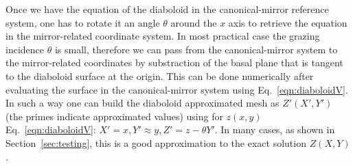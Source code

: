 \documentclass{iucr}              %
\newcommand{\inred}[1]{{\color{red}#1}}
\begin{document}







Once we have the equation of the diaboloid in the canonical-mirror reference system, one has to rotate it an angle $\theta$ around the $x$ axis to retrieve the equation in the mirror-related coordinate system. 
In most practical case the grazing incidence $\theta$ is small, therefore we can pass from the canonical-mirror system to the mirror-related coordinates by substraction of the basal plane that is tangent to the diaboloid surface at the origin. This can be done numerically after evaluating the surface in the canonical-mirror system using Eq.~\ref{eqn:diaboloidV}. \inred{
In such a way one can build the diaboloid approximated mesh as $Z'(X',Y')$ (the primes indicate approximated values) using for $z(x,y)$ Eq.~\ref{eqn:diaboloidV}: $X'=x, Y'\approx y, Z'=z - \theta Y'$. In many cases, as shown in Section~\ref{sec:testing}, this is a good approximation to the exact solution $Z(X,Y)$. }  
\end{document}
